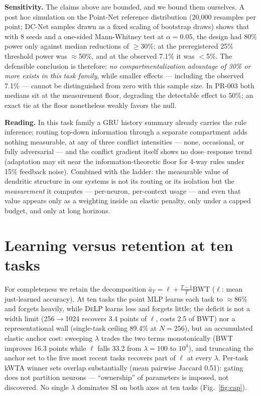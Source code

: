 \documentclass[conference]{IEEEtran}
\newcommand{\delp}{\textsc{DeLP}}
\newcommand{\bwt}{\mathrm{BWT}}
\begin{document}
\noindent\textbf{Sensitivity.} The claims above are bounded, and we bound them ourselves. A post
hoc simulation on the Point-Net reference distribution (20{,}000 resamples per point; DC-Net
samples drawn as a fixed scaling of bootstrap draws) shows that with 8 seeds and a one-sided
Mann-Whitney test at $\alpha=0.05$, the design had 80\% power only against median reductions of
$\geq$30\%; at the preregistered 25\% threshold power was $\approx$50\%, and at the observed 7.1\%
it was $<$5\%. The defensible conclusion is therefore: \emph{no compartmentalization advantage of
30\% or more exists in this task family}, while smaller effects --- including the observed 7.1\% ---
cannot be distinguished from zero with this sample size. In PR-003 both medians sit at the
measurement floor, degrading the detectable effect to 50\%; an exact tie at the floor nonetheless
weakly favors the null.

\noindent\textbf{Reading.} In this task family a GRU history summary already carries the rule
inference; routing top-down information through a separate compartment adds nothing measurable,
at any of three conflict intensities --- none, occasional, or fully adversarial --- and the
conflict gradient itself shows no dose--response trend (adaptation may sit near the
information-theoretic floor for 4-way
rules under 15\% feedback noise). Combined with the ladder: the measurable
value of dendritic structure in our systems is not its routing or its isolation but the
\emph{measurement} it computes --- per-neuron, per-context usage --- and even that value appears
only as a weighting inside an elastic penalty, only under a capped budget, and only at long
horizons.

\section{Learning versus retention at ten tasks}\label{sec:lam}
For completeness we retain the decomposition $\bar{a}_T = \ell + \frac{T-1}{T}\bwt$ ($\ell$: mean
just-learned accuracy). At ten tasks the point MLP learns each task to $\approx$86\% and forgets
heavily, while \delp{} learns less and forgets little; the deficit is not a width limit
(256$\to$1024 recovers 3.4 points of $\ell$, costs 2.5 of BWT) nor a representational wall
(single-task ceiling 89.4\% at $N{=}256$), but an accumulated elastic anchor cost: sweeping
$\lambda$ trades the two terms monotonically (BWT improves 16.3 points while $\ell$ falls 33.2
from $\lambda{=}100$ to $10^4$), and truncating the anchor set to the five most recent tasks
recovers part of $\ell$ at every $\lambda$. Per-task kWTA winner sets overlap substantially (mean
pairwise Jaccard 0.51): gating does not partition neurons --- ``ownership'' of parameters is
imposed, not discovered. No single $\lambda$ dominates SI on both axes at ten tasks
(Fig.~\ref{fig:cap}).
\end{document}
